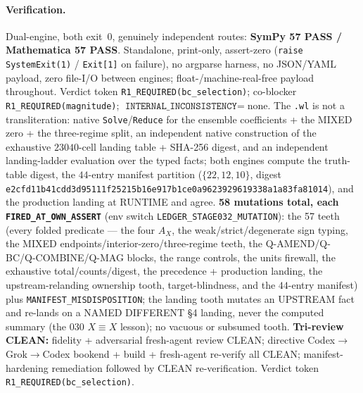 \paragraph{Verification.}
Dual-engine, both exit~0, genuinely independent routes:
\textbf{SymPy 57 PASS / Mathematica 57 PASS}. Standalone, print-only, assert-zero
(\texttt{raise SystemExit(1)} / \texttt{Exit[1]} on failure), no argparse harness,
no JSON/YAML payload, zero file-I/O between engines; float-/machine-real-free
payload throughout. Verdict token \texttt{R1\_REQUIRED(bc\_selection)}; co-blocker
\texttt{R1\_REQUIRED(magnitude)}; \(\texttt{INTERNAL\_INCONSISTENCY}=\)none. The
\texttt{.wl} is not a transliteration: native \texttt{Solve}/\texttt{Reduce} for the
ensemble coefficients + the MIXED zero + the three-regime split, an independent
native construction of the exhaustive \(23040\)-cell landing table + SHA-256 digest,
and an independent landing-ladder evaluation over the typed facts; both engines
compute the truth-table digest, the \(44\)-entry manifest partition
(\(\{22,12,10\}\), digest
\texttt{e2cfd11b41cdd3d95111f25215b16e917b1ce0a9623929619338a1a83fa81014}), and the
production landing at RUNTIME and agree. \textbf{58 mutations total, each
\texttt{FIRED\_AT\_OWN\_ASSERT}} (env switch \texttt{LEDGER\_STAGE032\_MUTATION}):
the 57 teeth (every folded predicate --- the four \(A_X\), the weak/strict/degenerate
sign typing, the MIXED endpoints/interior-zero/three-regime teeth, the
Q-AMEND/Q-BC/Q-COMBINE/Q-MAG blocks, the range controls, the units firewall, the
exhaustive total/counts/digest, the precedence + production landing, the
upstream-relanding ownership tooth, target-blindness, and the \(44\)-entry manifest)
plus \texttt{MANIFEST\_MISDISPOSITION}; the landing tooth mutates an UPSTREAM fact
and re-lands on a NAMED DIFFERENT \S4 landing, never the computed summary (the 030
\(X\equiv X\) lesson); no vacuous or subsumed tooth. \textbf{Tri-review CLEAN:}
fidelity + adversarial fresh-agent review CLEAN; directive Codex\(\to\)Grok\(\to\)Codex
bookend + build + fresh-agent re-verify all CLEAN; manifest-hardening
remediation followed by CLEAN re-verification. Verdict token
\texttt{R1\_REQUIRED(bc\_selection)}.
